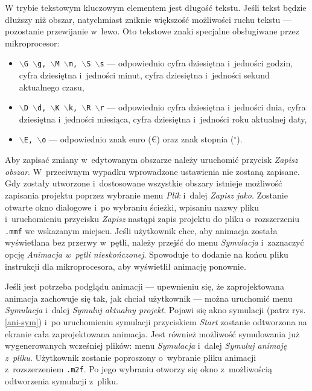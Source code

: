 W trybie tekstowym kluczowym elementem jest długość tekstu. Jeśli tekst będzie dłuższy niż obszar, natychmiast zniknie większość możliwości ruchu tekstu --- pozostanie przewijanie w~lewo. Oto tekstowe znaki specjalne obsługiwane przez mikroprocesor:

\begin{itemize}
	\item \texttt{$\backslash$G $\backslash$g, $\backslash$M $\backslash$m, $\backslash$S $\backslash$s} --- odpowiednio cyfra dziesiętna i~jedności godzin, cyfra dziesiętna i~jedności minut, cyfra dziesiętna i~jedności sekund aktualnego czasu,
	\item \texttt{$\backslash$D $\backslash$d, $\backslash$K $\backslash$k, $\backslash$R $\backslash$r} --- odpowiednio cyfra dziesiętna i~jedności dnia, cyfra dziesiętna i~jedności miesiąca, cyfra dziesiętna i~jedności roku aktualnej daty,
	\item \texttt{$\backslash$E, $\backslash$o} --- odpowiednio znak euro (\euro) oraz znak stopnia ($^\circ$).
\end{itemize}

Aby zapisać zmiany w~edytowanym obszarze należy uruchomić przycisk \textit{Zapisz obszar}. W~przeciwnym wypadku wprowadzone ustawienia nie zostaną zapisane. Gdy zostały utworzone i~dostosowane wszystkie obszary istnieje możliwość zapisania projektu poprzez wybranie menu \textit{Plik} i~dalej \textit{Zapisz jako}. Zostanie otwarte okno dialogowe i~po wybraniu ścieżki, wpisaniu nazwy pliku i~uruchomieniu przycisku \textit{Zapisz} nastąpi zapis projektu do pliku o~rozszerzeniu \texttt{.mmf} we wskazanym miejscu. Jeśli użytkownik chce, aby animacja została wyświetlana bez przerwy w~pętli, należy przejść do menu \textit{Symulacja} i~zaznaczyć opcję \textit{Animacja w~pętli nieskończonej}. Spowoduje to dodanie na końcu pliku instrukcji dla mikroprocesora, aby wyświetlił animację ponownie.

Jeśli jest potrzeba podglądu animacji --- upewnieniu się, że zaprojektowana animacja zachowuje się tak, jak chciał użytkownik --- można uruchomić menu \textit{Symulacja} i~dalej \textit{Symuluj aktualny projekt}. Pojawi się akno symulacji (patrz rys. \ref{ani-sym}) i~po uruchomieniu symulacji przyciskiem \textit{Start} zostanie odtworzona na ekranie cała zaprojektowana animacja. Jest również możliwość symulowania już wygenerowanych wcześniej plików: menu \textit{Symulacja} i~dalej \textit{Symuluj animaję z~pliku}. Użytkownik zostanie poproszony o~wybranie pliku animacji z~rozszerzeniem \texttt{.m2f}. Po jego wybraniu otworzy się okno z~możliwością odtworzenia symulacji z~pliku.

